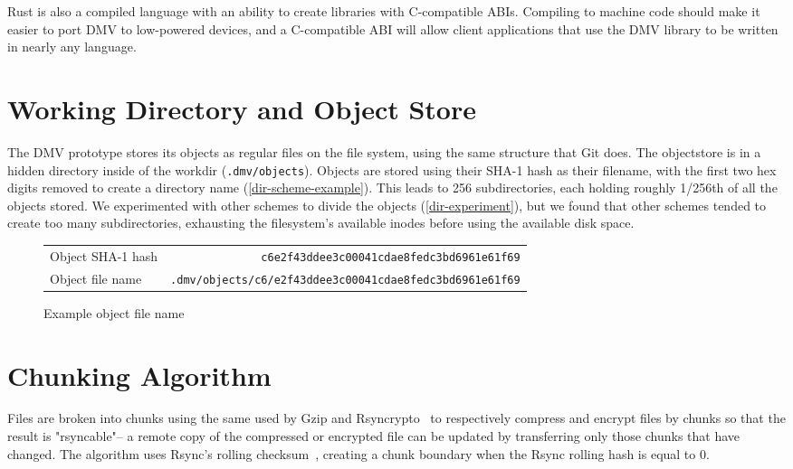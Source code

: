 Rust is also a compiled language with an ability to create libraries with
C-compatible \glspl{ABI}. Compiling to machine code should make it easier to
port \gls{DMV} to low-powered devices, and a C-compatible \gls{ABI} will allow
client applications that use the \gls{DMV} library to be written in nearly any
language.

%



\section{Working Directory and Object Store}\label{dir-impl}

The \gls{DMV} prototype stores its objects as regular files on the file system,
using the same structure that Git does. The \gls{objectstore} is in a hidden
directory inside of the \gls{workdir} (\lstinline{.dmv/objects}). Objects are
stored using their SHA-1 hash as their filename, with the first two hex digits
removed to create a directory name (\autoref{dir-scheme-example}). This leads to
\num{256} subdirectories, each holding roughly \num{1/256}th of all the objects
stored. We experimented with other schemes to divide the objects
(\autoref{dir-experiment}), but we found that other schemes tended to create too
many subdirectories, exhausting the filesystem's available \glspl{inode} before
using the available disk space.

\begin{figure}[h]
    \caption{Example object file name}
    \label{dir-scheme-example}
    \begin{tabular}{ l r }
        Object SHA-1 hash & \lstinline{c6e2f43ddee3c00041cdae8fedc3bd6961e61f69} \\
        Object file name & \lstinline{.dmv/objects/c6/e2f43ddee3c00041cdae8fedc3bd6961e61f69} \\
    \end{tabular}
\end{figure}

%


\section{Chunking Algorithm}\label{chunking-algorithm}

Files are broken into chunks using the same  used by Gzip
and Rsyncrypto~\cite{rsyncrypto_algorithm} to respectively compress and encrypt
files by chunks so that the result is "rsyncable"-- a remote copy of the
compressed or encrypted file can be updated by transferring only those chunks
that have changed. The algorithm uses Rsync's rolling
checksum~\cite{rsynctechreport}, creating a chunk boundary when the Rsync
rolling hash is equal to \num{0}.

